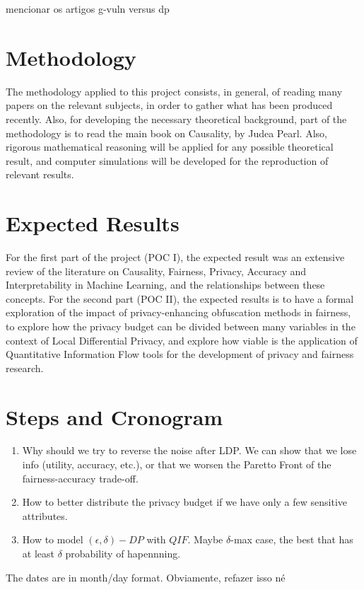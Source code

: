 \documentclass{article}
\begin{document}
{\color{red} mencionar os artigos g-vuln versus dp}

\section{Methodology}

The methodology applied to this project consists, in general, of reading many papers on the relevant subjects, in order to gather what has been produced recently. Also, for developing the necessary theoretical background, part of the methodology is to read the main book on Causality\cite{Causality}, by Judea Pearl. Also, rigorous mathematical reasoning will be applied for any possible theoretical result, and computer simulations will be developed for the reproduction of relevant results.

\section{Expected Results}

For the first part of the project (POC I), the expected result was an extensive review of the literature on Causality, Fairness, Privacy, Accuracy and Interpretability in Machine Learning, and the relationships between these concepts. For the second part (POC II), the expected results is to have a formal exploration of the impact of privacy-enhancing obfuscation methods in fairness, to explore how the privacy budget can be divided between many variables in the context of Local Differential Privacy, and explore how viable is the application of Quantitative Information Flow tools for the development of privacy and fairness research.

\section{Steps and Cronogram}
{\color{red}
\begin{enumerate}
    \item Why should we try to reverse the noise after LDP. We can show that we lose info (utility, accuracy, etc.), or that we worsen the Paretto Front of the fairness-accuracy trade-off.
    \item How to better distribute the privacy budget if we have only a few sensitive attributes.
    \item How to model $(\epsilon,\delta)-DP$ with $QIF$. Maybe $\delta$-max case, the best that has at least $\delta$ probability of hapennning.
\end{enumerate}
}
The dates are in month/day format. {\color{red} Obviamente, refazer isso né}
\end{document}
